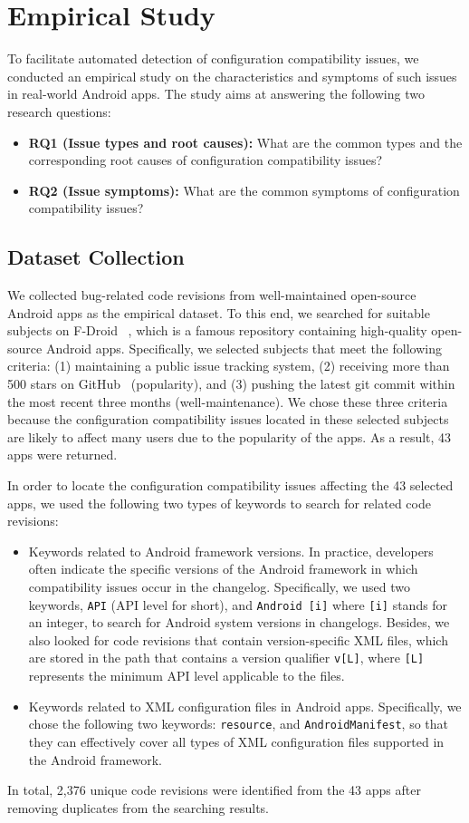 \section{Empirical Study}
\label{sec:3}
To facilitate automated detection of configuration compatibility issues, we conducted an empirical study on the characteristics and symptoms of such issues in real-world Android apps.
The study aims at answering the following two research questions:
\begin{itemize}
	\item \textbf{RQ1 (Issue types and root causes):} What are the common types and the corresponding root causes of configuration compatibility issues?
	\item \textbf{RQ2 (Issue symptoms):} What are the common symptoms of configuration compatibility issues?
\end{itemize}

\subsection{Dataset Collection}
We collected bug-related code revisions from well-maintained open-source
Android apps as the empirical dataset.
To this end, we searched for suitable subjects on F-Droid
~\cite{fdroid}, which is a famous repository containing high-quality open-source Android apps.
Specifically, we selected subjects that meet the following criteria: (1)
maintaining a public issue tracking system, (2) receiving more than 500 stars on
GitHub~\cite{github} (popularity), and (3) pushing the latest git commit within 
the most recent three months (well-maintenance).
We chose these three criteria because the configuration compatibility issues
located in these selected subjects are likely to affect many users due to the popularity of the apps. 
As a result, 43 apps were returned. 

In order to locate the configuration compatibility issues affecting the 43
selected apps, we used the following two types of keywords to search for
related code revisions:
\begin{itemize}
	\item Keywords related to Android framework versions. In practice, developers often indicate the specific versions of the Android framework in which compatibility issues occur in the changelog.
	Specifically, we used two keywords, \texttt{API} (API level for short), and \texttt{Android [i]} where \texttt{[i]} stands for an integer, to search for Android system versions in changelogs.
	Besides, we also looked for code revisions that contain version-specific XML files, which are stored in the path that contains a version qualifier \texttt{v[L]}, where \texttt{[L]} represents the minimum API level applicable to the files.
	\item Keywords related to XML configuration files in Android apps.
	Specifically, we chose the following two keywords: \texttt{resource}, and \texttt{AndroidManifest}, so that they can effectively cover all types of XML configuration files supported in the Android framework.
\end{itemize}
In total, 2,376 unique code revisions were identified from the 43 apps after removing duplicates from the searching results.

